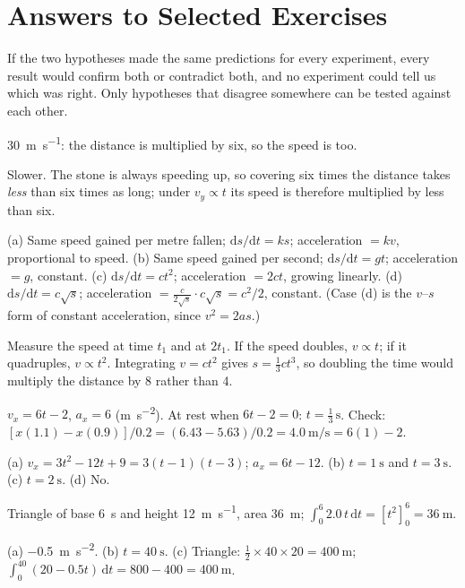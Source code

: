 \documentclass[11pt,twoside,openany]{book}
\newcommand{\dd}{\mathrm{d}}
\begin{document}
\section*{Answers to Selected Exercises}
\begin{description}[leftmargin=2.6em,itemsep=3pt,style=sameline]
  \item[2.1] If the two hypotheses made the same predictions for every experiment, every result would confirm both or contradict both, and no experiment could tell us which was right. Only hypotheses that disagree somewhere can be tested against each other.
  \item[2.2] \SI{30}{\metre\per\second}: the distance is multiplied by six, so the speed is too.
  \item[2.3] Slower. The stone is always speeding up, so covering six times the distance takes \emph{less} than six times as long; under $v_y \propto t$ its speed is therefore multiplied by less than six.
  \item[2.4] (a) Same speed gained per metre fallen; $\dd s/\dd t = ks$; acceleration $= kv$, proportional to speed. (b) Same speed gained per second; $\dd s/\dd t = gt$; acceleration $= g$, constant. (c) $\dd s/\dd t = ct^2$; acceleration $= 2ct$, growing linearly. (d) $\dd s/\dd t = c\sqrt{s}$; acceleration $= \frac{c}{2\sqrt{s}}\cdot c\sqrt{s} = c^2/2$, constant. (Case (d) is the $v$--$s$ form of constant acceleration, since $v^2 = 2as$.)
  \item[2.5] Measure the speed at time $t_1$ and at $2t_1$. If the speed doubles, $v \propto t$; if it quadruples, $v \propto t^2$. Integrating $v = ct^2$ gives $s = \tfrac13 c t^3$, so doubling the time would multiply the distance by \num{8} rather than \num{4}.
  \item[2.6] $v_x = 6t - 2$, $a_x = 6$ (\si{\metre\per\second\squared}). At rest when $6t - 2 = 0$: $t = \tfrac13\,\si{\second}$. Check: $[x(1.1) - x(0.9)]/0.2 = (6.43 - 5.63)/0.2 = \SI{4.0}{\metre\per\second} = 6(1) - 2$.
  \item[2.7] (a) $v_x = 3t^2 - 12t + 9 = 3(t-1)(t-3)$; $a_x = 6t - 12$. (b) $t = \SI{1}{\second}$ and $t = \SI{3}{\second}$. (c) $t = \SI{2}{\second}$. (d) No.
  \item[2.9] Triangle of base \SI{6}{\second} and height \SI{12}{\metre\per\second}, area \SI{36}{\metre}; $\int_0^6 2.0\,t\,\dd t = [t^2]_0^6 = \SI{36}{\metre}$.
  \item[2.10] (a) \SI{-0.5}{\metre\per\second\squared}. (b) $t = \SI{40}{\second}$. (c) Triangle: $\tfrac12 \times 40 \times 20 = \SI{400}{\metre}$; $\int_0^{40}(20 - 0.5t)\,\dd t = 800 - 400 = \SI{400}{\metre}$.

\end{description}
\end{document}
